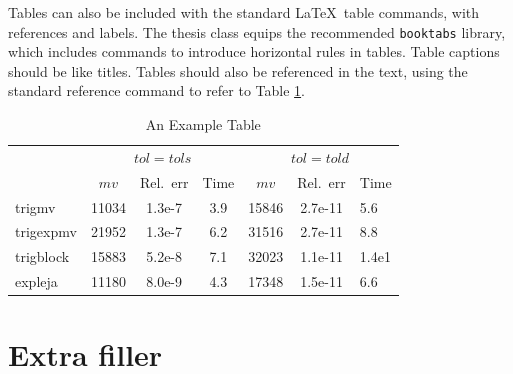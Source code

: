 Tables can also be included with the standard \LaTeX \ table commands, with
references and labels. The thesis class equips the recommended
\texttt{booktabs} library, which includes commands to introduce horizontal
rules in tables. Table captions should be like titles. Tables should also
be referenced in the text, using the standard reference command to refer
to Table \ref{tab:example}.

\begin{table}
  \begin{center}
\caption{\label{tab:example} An Example Table}
\begin{tabular}{lcccccl}
  \toprule
& \multicolumn{3}{c}{$tol=tols$} & \multicolumn{3}{c}{$tol=told$}
\\\cmidrule(lr){2-4}
\cmidrule(lr){5-7}
           & $mv$  & Rel.~err & Time    & $mv$  & Rel.~err & Time\\
\midrule
trigmv    & 11034 & 1.3e-7 & 3.9 & 15846 & 2.7e-11 & 5.6 \\
trigexpmv & 21952 & 1.3e-7 & 6.2 & 31516 & 2.7e-11 & 8.8 \\
trigblock & 15883 & 5.2e-8 & 7.1 & 32023 & 1.1e-11 & 1.4e1\\
expleja   & 11180 & 8.0e-9 & 4.3 & 17348 & 1.5e-11 & 6.6 \\
\bottomrule
\end{tabular}
\end{center}
\end{table}

\section{Extra filler}
\lipsum
